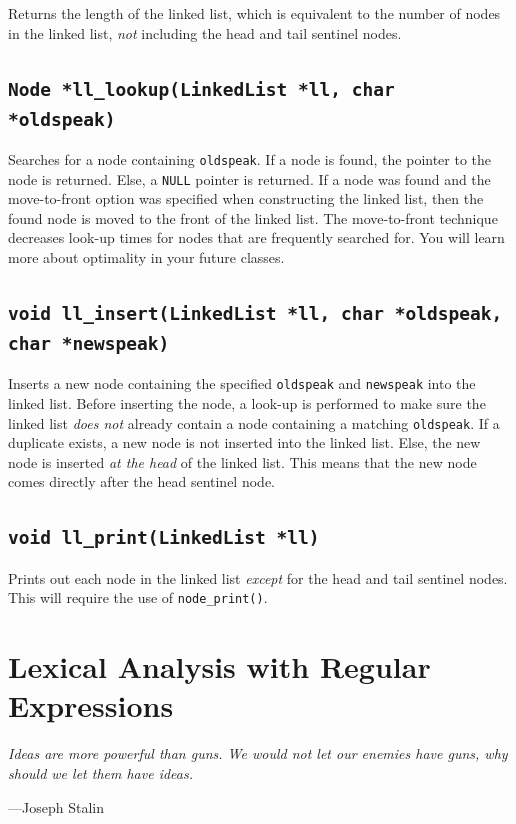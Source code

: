 \documentclass{article}
\begin{document}
Returns the length of the linked list, which is equivalent to the number
of nodes in the linked list, \emph{not} including the head and tail
sentinel nodes.

\subsection{\texttt{Node *ll\_lookup(LinkedList *ll, char
*oldspeak)}}

Searches for a node containing \texttt{oldspeak}. If a node is found,
the pointer to the node is returned. Else, a \texttt{NULL} pointer is
returned. If a node was found and the move-to-front option was specified
when constructing the linked list, then the found node is moved to the
front of the linked list. The move-to-front technique decreases look-up
times for nodes that are frequently searched for. You will learn more
about optimality in your future classes.

\subsection{\texttt{void ll\_insert(LinkedList *ll, char *oldspeak,
char *newspeak)}}

Inserts a new node containing the specified \texttt{oldspeak} and
\texttt{newspeak} into the linked list. Before inserting the node, a
look-up is performed to make sure the linked list \emph{does not} already
contain a node containing a matching \texttt{oldspeak}. If a duplicate
exists, a new node is not inserted into the linked list. Else, the new
node is inserted \emph{at the head} of the linked list. This means
that the new node comes directly after the head sentinel node.

\subsection{\texttt{void ll\_print(LinkedList *ll)}}

Prints out each node in the linked list \emph{except} for the head and
tail sentinel nodes. This will require the use of
\texttt{node\_print()}.


\section{Lexical Analysis with Regular Expressions}

\textwidth
\epigraph{\emph{Ideas are more powerful than guns. We would not let our
enemies have guns, why should we let them have ideas.}}{---Joseph
Stalin}
\end{document}
